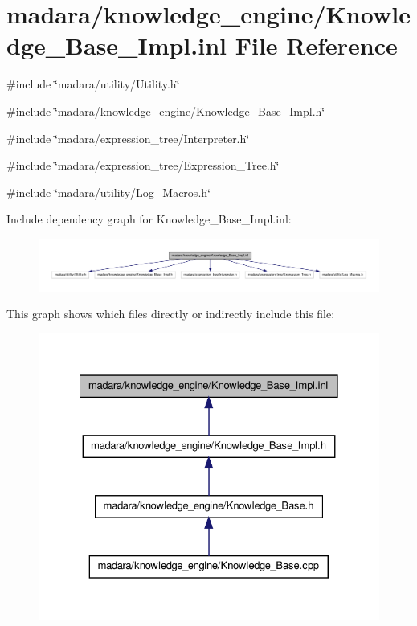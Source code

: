 \hypertarget{Knowledge__Base__Impl_8inl}{
\section{madara/knowledge\_\-engine/Knowledge\_\-Base\_\-Impl.inl File Reference}
\label{da/d3c/Knowledge__Base__Impl_8inl}
}
{\ttfamily \#include \char`\"{}madara/utility/Utility.h\char`\"{}}\par
{\ttfamily \#include \char`\"{}madara/knowledge\_\-engine/Knowledge\_\-Base\_\-Impl.h\char`\"{}}\par
{\ttfamily \#include \char`\"{}madara/expression\_\-tree/Interpreter.h\char`\"{}}\par
{\ttfamily \#include \char`\"{}madara/expression\_\-tree/Expression\_\-Tree.h\char`\"{}}\par
{\ttfamily \#include \char`\"{}madara/utility/Log\_\-Macros.h\char`\"{}}\par
Include dependency graph for Knowledge\_\-Base\_\-Impl.inl:
\nopagebreak
\begin{figure}[H]
\begin{center}
\leavevmode
\includegraphics[width=400pt]{dd/d57/Knowledge__Base__Impl_8inl__incl}
\end{center}
\end{figure}
This graph shows which files directly or indirectly include this file:
\nopagebreak
\begin{figure}[H]
\begin{center}
\leavevmode
\includegraphics[width=328pt]{db/d1c/Knowledge__Base__Impl_8inl__dep__incl}
\end{center}
\end{figure}
